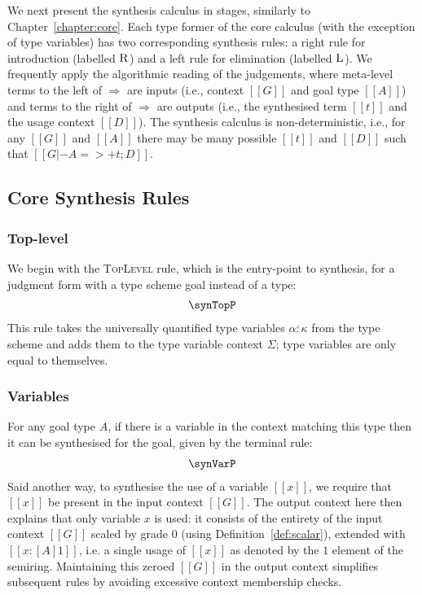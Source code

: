 We next present the synthesis calculus in stages, similarly to
Chapter~\ref{chapter:core}. Each type former of the core calculus (with the
exception of type variables) has two corresponding synthesis rules: a right rule
for introduction (labelled $\textsc{R}$) and a left rule for elimination
(labelled $\textsc{L}$). We frequently apply the algorithmic reading of the
judgements, where meta-level terms to the left of $\Rightarrow$ are inputs
(i.e., context $[[ G ]]$ and goal type $[[ A ]]$) and terms to the right of
$\Rightarrow$ are outputs (i.e., the synthesised term $[[ t ]]$ and the usage
context $[[ D ]]$).
%
The synthesis calculus is non-deterministic, i.e., for any $[[ G ]]$
and $[[ A ]]$ there may be many possible $[[ t ]]$ and $[[ D ]]$ such
that $[[ G |- A =>+ t ; D ]]$. 

\subsection{Core Synthesis Rules}
\label{subsection:rules}
\subsubsection{Top-level}
We begin with the \textsc{TopLevel} rule, which is the entry-point to synthesis, 
for a judgment form with a type scheme goal instead of a
type:
\begin{align*}
  \synTopP
\end{align*}
This rule takes the universally quantified type variables $\overline{\alpha : \kappa}$
from the type scheme and adds them to the type variable context $\Sigma$;
type variables are only equal to themselves.

\subsubsection{Variables}
For any goal type $A$, if there is a variable in the context matching this type
then it can be synthesised for the goal, given by the terminal rule:
%
\begin{align*}
  \synVarP
\end{align*}
%
Said another way, to synthesise the use of a variable $[[ x ]]$, we require that $[[ x ]]$ be
present in the input context $[[ G ]]$. The output context here then explains
that only variable $x$ is used: it consists of the
entirety of the input context $[[ G ]]$ scaled by grade $0$ (using
Definition~\ref{def:scalar}), extended with $[[x : [A] 1]]$, i.e. a single usage
of $[[ x ]]$ as denoted by the $1$ element of the semiring.
Maintaining this zeroed $[[ G ]]$ in the output context simplifies
subsequent rules by avoiding excessive context membership checks.


